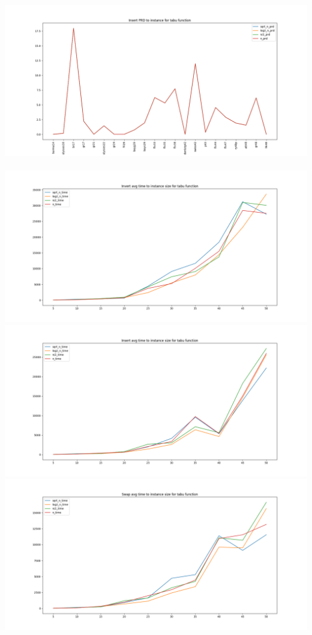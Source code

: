 \documentclass{article}
\begin{document}
\begin{multicols}{2}
\begin{center}
    \includegraphics[scale=0.2]{tabu_ins_prd.png}
    \\~\\
    \includegraphics[scale=0.2]{rand_tabu_inv_time.png}
    \includegraphics[scale=0.2]{rand_tabu_ins_time.png}
    \includegraphics[scale=0.2]{rand_tabu_swp_time.png}

\end{center}
\end{multicols}
\end{document}
